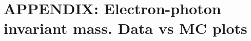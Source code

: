 \section{APPENDIX: Electron-photon invariant mass. Data vs MC plots}
\label{sec:Mpholep1DatavsMC}



